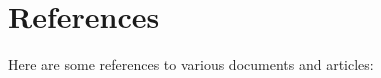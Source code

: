 \documentclass[11pt, a4paper, oneside]{Thesis} %
\begin{document}

% 
%
%


\backmatter








\chapter{References}
Here are some references to various documents and articles:
\end{document}
